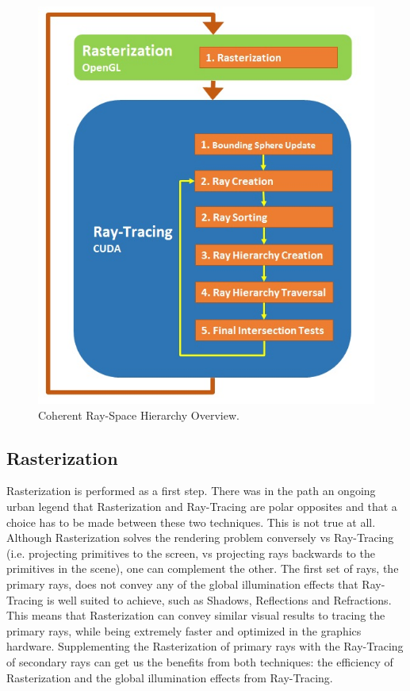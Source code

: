 \documentclass{egpubl}
\begin{document}
\begin{figure}
    \centering
    \includegraphics[scale=0.50]{images/overview.jpg}
    \caption{\label{fig:crsh}Coherent Ray-Space Hierarchy Overview.}
\end{figure}

\subsection{Rasterization}

Rasterization is performed as a first step. There was in the path an ongoing urban legend that Rasterization and Ray-Tracing are polar opposites and that a choice has to be made between these two techniques. This is not true at all. Although Rasterization solves the rendering problem conversely vs Ray-Tracing (i.e. projecting primitives to the screen, vs projecting rays backwards to the primitives in the scene), one can complement the other. The first set of rays, the primary rays, does not convey any of the global illumination effects that Ray-Tracing is well suited to achieve, such as Shadows, Reflections and Refractions. This means that Rasterization can convey similar visual results to tracing the primary rays, while being extremely faster and optimized in the graphics hardware. Supplementing the Rasterization of primary rays with the Ray-Tracing of secondary rays can get us the benefits from both techniques: the efficiency of Rasterization and the global illumination effects from Ray-Tracing.
\end{document}
